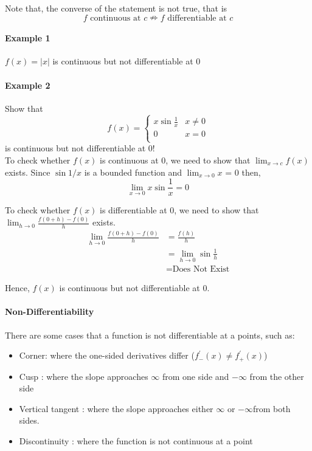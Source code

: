 \documentclass[12pt]{article}
\begin{document}
\noindent
Note that, the converse of the statement is not true, that is
\[
    f \textrm{ continuous at } c \nRightarrow f \textrm{ differentiable at } c
\]
\paragraph{Example 1} $f(x) = |x|$ is continuous but not differentiable at 0
\paragraph{Example 2} Show that
\[ f(x) =
    \begin{cases} 
        x \sin{\frac{1}{x}} & x \neq 0 \\
        0 & x = 0 \\
    \end{cases}
\]
is continuous but not differentiable at 0! \\

\noindent
To check whether $f(x)$ is continuous at 0, we need to show that $\lim_{x \to c} f(x)$ exists. Since 
$\sin{1/x}$ is a bounded function and $\lim_{x \to 0} x$ = 0 then, 
\[
    \lim_{x \to 0} x \sin{\frac{1}{x}} = 0
\]

\noindent
To check whether $f(x)$ is differentiable at 0, we need to show that $\lim_{h \to 0} \frac{f(0 + h) - f(0)}{h}$ exists. 
\begin{align*} 
    \lim_{h \to 0} \frac{f(0 + h) - f(0)}{h} &= \frac{f(h)}{{h}} \\
    &= \lim_{h \to 0} \sin{\frac{1}{h}} \\
    &= \textrm{Does Not Exist}
\end{align*}

\noindent
Hence, $f(x)$ is continuous but not differentiable at 0.

\paragraph{Non-Differentiability} There are some cases that a function is not differentiable at a points, such as:
\begin{itemize} 
     \item Corner: where the one-sided derivatives differ  ($f^{'}_{-}(x) \neq f^{'}_{+}(x)$)
     \item Cusp : where the slope approaches $\infty$ from one side and $-\infty$ from the other side
     \item Vertical tangent : where the slope approaches either $\infty$ or $-\infty$from both sides.
     \item Discontinuity : where the function is not continuous at a point
\end{itemize}
\end{document}
